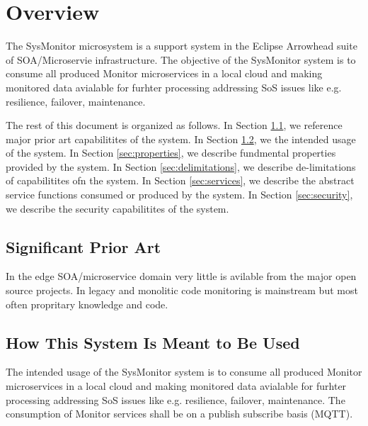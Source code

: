 \documentclass[a4paper]{arrowhead}
\begin{document}
\newpage

\tableofcontents
\newpage

\section{Overview}
\label{sec:overview}
  The SysMonitor microsystem is a support system in the Eclipse
    Arrowhead suite of SOA/Microservie infrastructure. The objective
    of the SysMonitor system is to consume all produced Monitor
    microservices in a local cloud and making monitored data avialable
    for furhter processing addressing SoS issues like e.g. resilience,
    failover, maintenance. 
    
The rest of this document is organized as follows.
In Section \ref{sec:prior_art}, we reference major prior art capabilitites
of the system.
In Section \ref{sec:use}, we the intended usage of the system.
In Section \ref{sec:properties}, we describe fundmental properties
provided by the system.
In Section \ref{sec:delimitations}, we describe de-limitations of capabilitites
ofn the system.
In Section \ref{sec:services}, we describe the abstract service
functions consumed or produced by the system.
In Section \ref{sec:security}, we describe the security capabilitites
of the system.


\subsection{Significant Prior Art}
\label{sec:prior_art}

In the edge SOA/microservice domain very little is avilable from the
major open source projects. In legacy and monolitic code monitoring is
mainstream but most often propritary knowledge and code. 

\subsection{How This System Is Meant to Be Used}
\label{sec:use}

The intended usage 
    of the SysMonitor system is to consume all produced Monitor
    microservices in a local cloud and making monitored data avialable
    for furhter processing addressing SoS issues like e.g. resilience,
    failover, maintenance. The consumption of Monitor services shall
    be on a publish subscribe basis (MQTT).  
    
\end{document}
